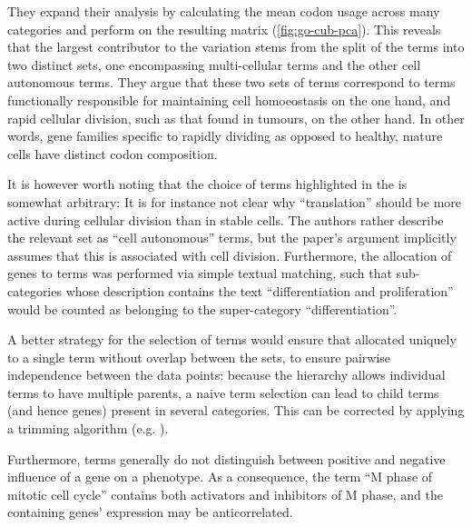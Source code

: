They expand their analysis by calculating the mean codon usage across many \go
categories and perform \pca on the resulting matrix (\cref{fig:go-cub-pca}).
This reveals that the largest contributor to the variation stems from the split
of the \go terms into two distinct sets, one encompassing multi-cellular \go
terms and the other cell autonomous \go terms. They argue that these two sets of
\go terms correspond to \go terms functionally responsible for maintaining cell
homoeostasis on the one hand, and rapid cellular division, such as that found in
tumours, on the other hand. In other words, gene families specific to
rapidly dividing as opposed to healthy, mature cells have distinct codon
composition.

It is however worth noting that the choice of \go terms highlighted in the \pca
is somewhat arbitrary: It is for instance not clear why “translation” should be
more active during cellular division than in stable cells. The authors rather
describe the relevant set as “cell autonomous” \go terms, but the paper’s
argument implicitly assumes that this is associated with cell division.
Furthermore, the allocation of genes to \go terms was performed via simple
textual matching, such that \go sub-categories whose description contains the
text “differentiation and proliferation” would be counted as belonging to the
\go super-category “differentiation”.

A better strategy for the selection of \go terms would ensure that allocated
uniquely to a single \go term without overlap between the sets, to ensure
pairwise independence between the data points: because the \go hierarchy allows
individual \go terms to have multiple parents, a naive \go term selection can
lead to child terms (and hence genes) present in several categories. This can be
corrected by applying a \go trimming algorithm (e.g. \citet{Jantzen:2011}).

Furthermore, \go terms generally do not distinguish between positive and
negative influence of a gene on a phenotype. As a consequence, the \go term “M
phase of mitotic cell cycle” contains both activators and inhibitors of M phase,
and the containing genes’ expression may be anticorrelated.

